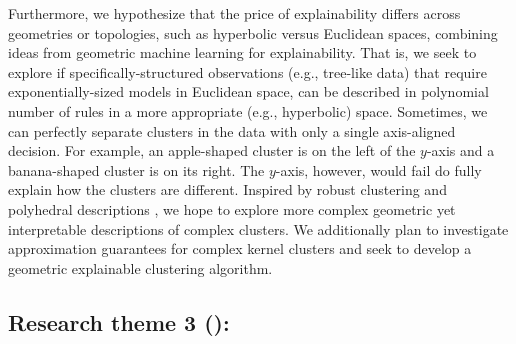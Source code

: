 \documentclass[a4paper,11pt]{article}
\begin{document}
Furthermore, we hypothesize that the price of explainability differs across geometries or topologies, 
such as hyperbolic versus Euclidean spaces, 
combining ideas from geometric machine learning for explainability. 
That is, we seek to explore if specifically-structured observations (e.g., tree-like data) 
that require exponentially-sized models in Euclidean space, 
can be described in polynomial number of rules in a more appropriate (e.g., hyperbolic) space.
Sometimes, we can perfectly separate clusters in the data with only a single axis-aligned decision.
For example, an apple-shaped cluster is on the left of the $y$-axis and a banana-shaped cluster is on its right. 
The $y$-axis, however, would fail do fully explain how the clusters are different.
Inspired by robust clustering and polyhedral descriptions \cite{lawless2023polyhedral},
we hope to explore more complex geometric yet interpretable descriptions of complex clusters.
We additionally plan to investigate approximation guarantees for complex kernel clusters and seek to develop a geometric explainable clustering algorithm.
\fi



\subsection*{Research theme 3 (\rth): \covariates}
\end{document}
